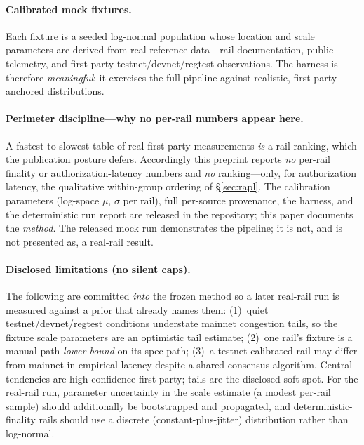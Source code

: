 \documentclass[11pt]{article}
\begin{document}
\paragraph{Calibrated mock fixtures.} Each fixture is a seeded log-normal population whose location and
scale parameters are derived from real reference data---rail documentation, public telemetry, and
first-party testnet/devnet/regtest observations. The harness is therefore \emph{meaningful}: it
exercises the full pipeline against realistic, first-party-anchored distributions.

\paragraph{Perimeter discipline---why no per-rail numbers appear here.} A fastest-to-slowest table of
real first-party measurements \emph{is} a rail ranking, which the publication posture defers.
Accordingly this preprint reports \emph{no} per-rail finality or authorization-latency numbers and
\emph{no} ranking---only, for authorization latency, the qualitative within-group ordering of
\S\ref{sec:rapl}. The calibration parameters (log-space $\mu$, $\sigma$ per rail), full per-source
provenance, the harness, and the deterministic run report are released in the repository; this paper
documents the \emph{method}. The released mock run demonstrates the pipeline; it is not, and is not
presented as, a real-rail result.

\paragraph{Disclosed limitations (no silent caps).} The following are committed \emph{into} the frozen
method so a later real-rail run is measured against a prior that already names them:
(1)~quiet testnet/devnet/regtest conditions understate mainnet congestion tails, so the fixture scale
parameters are an optimistic tail estimate; (2)~one rail's fixture is a manual-path \emph{lower bound}
on its spec path; (3)~a testnet-calibrated rail may differ from mainnet in empirical latency despite a
shared consensus algorithm. Central tendencies are high-confidence first-party; tails are the disclosed
soft spot. For the real-rail run, parameter uncertainty in the scale estimate (a modest per-rail sample)
should additionally be bootstrapped and propagated, and deterministic-finality rails should use a
discrete (constant-plus-jitter) distribution rather than log-normal.
\end{document}
